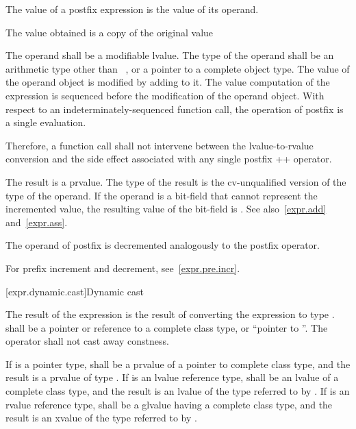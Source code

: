 \pnum
{}%
%
%
%
The value of a postfix \tcode{++} expression is the value of its
operand.
\begin{note}
The value obtained is a copy of the original value
\end{note}
The operand shall be a modifiable lvalue. The type of the operand shall
be an arithmetic type other than \cv{}~,
or a pointer to a complete object type. The value
of the operand object is modified by adding  to it.
The
%
value computation of the \tcode{++} expression is sequenced before the
modification of the operand object. With respect to an
indeterminately-sequenced function call, the operation of postfix
\tcode{++} is
a single evaluation.
\begin{note}
Therefore, a function call shall not intervene between the
lvalue-to-rvalue conversion and the side effect associated with any
single postfix ++ operator.
\end{note}
The result is a prvalue. The type of the result is the cv-unqualified
version of the type of the operand.
If the operand is a bit-field that cannot represent the incremented value, the
resulting value of the bit-field is
.
See also~\ref{expr.add}
and~\ref{expr.ass}.

\pnum
{}%
%
%
%
The operand of postfix \tcode{\dcr} is decremented analogously to the
postfix \tcode{++} operator.
\begin{note}
For prefix increment and decrement, see~\ref{expr.pre.incr}.
\end{note}

[expr.dynamic.cast]{Dynamic cast}

\pnum
{}%
%
The result of the expression  is the result of
converting the expression  to type .
%
 shall be a pointer or reference to a complete class type, or
``pointer to  ''. The  operator shall not cast
away constness.

\pnum
If  is a pointer type,  shall be a prvalue of a
pointer to complete class type, and the result is a prvalue of type
. If  is an lvalue reference type,  shall be
an lvalue of a complete class type, and the result is an lvalue of the
type referred to by . If  is an rvalue reference type,
 shall be a glvalue having a complete class type, and the
result is an xvalue of the type referred to by .

